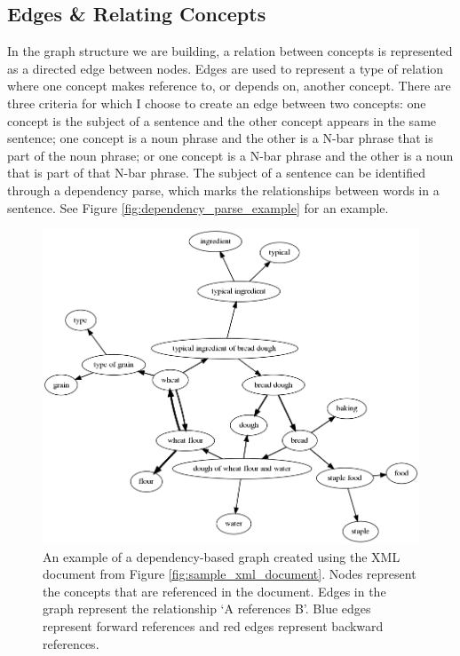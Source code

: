 \documentclass[12pt]{article}
\theoremstyle{grammarstyle}
\begin{document}
\subsection{Edges \& Relating Concepts}
In the graph structure we are building, a relation between concepts is represented as a directed edge between nodes. Edges are used to represent a type of relation where one concept makes reference to, or depends on, another concept. There are three criteria for which I choose to create an edge between two concepts: one concept is the subject of a sentence and the other concept appears in the same sentence; one concept is a noun phrase and the other is a N-bar phrase that is part of the noun phrase; or one concept is a N-bar phrase and the other is a noun that is part of that N-bar phrase. The subject of a sentence can be identified through a dependency parse, which marks the relationships between words in a sentence. See Figure \ref{fig:dependency_parse_example} for an example. 

\begin{figure}
    \centering
    \includegraphics[width=\linewidth]{reports/technical_report/latex/figures/bread_graph-sections_only-implicit_references.png}
    \caption{An example of a dependency-based graph created using the XML document from Figure \ref{fig:sample_xml_document}. Nodes represent the concepts that are referenced in the document. Edges in the graph represent the relationship `A references B'. Blue edges represent forward references and red edges represent backward references.}
    \label{fig:graph_example}
\end{figure}
\end{document}

